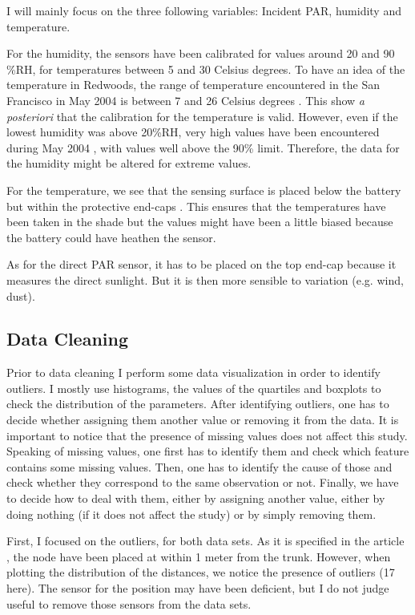 \documentclass[11pt]{article}\usepackage[]{graphicx}\usepackage[]{color}
\begin{document}
I will mainly focus on the three following variables: Incident PAR, humidity and temperature.

For the humidity, the sensors have been calibrated for values around 20 and 90 \%RH, for temperatures between 5 and 30 Celsius degrees. To have an idea of the temperature in Redwoods, the range of temperature encountered in the San Francisco in May 2004 is between 7 and 26 Celsius degrees \cite{weatherspark}. This show \textit{a posteriori} that the calibration for the temperature is valid. However, even if the lowest humidity was above 20\%RH, very high values have been encountered during May 2004 \cite{weatherspark}, with values well above the 90\% limit. Therefore, the data for the humidity might be altered for extreme values.

For the temperature, we see that the sensing surface is placed below the battery but within the protective end-caps \cite{tolle2005macroscope}. This ensures that the temperatures have been taken in the shade but the values might have been a little biased because the battery could have heathen the sensor.

As for the direct PAR sensor, it has to be placed on the top end-cap \cite{tolle2005macroscope} because it measures the direct sunlight. But it is then more sensible to variation (e.g. wind, dust). 

\subsection{Data Cleaning}

Prior to data cleaning I perform some data visualization in order to identify outliers. I mostly use histograms, the values of the quartiles and boxplots to check the distribution of the parameters. After identifying outliers, one has to decide whether assigning them another value or removing it from the data. It is important to notice that the presence of missing values does not affect this study. Speaking of missing values, one first has to identify them and check which feature contains some missing values. Then, one has to identify the cause of those and check whether they correspond to the same observation or not. Finally, we have to decide how to deal with them, either by assigning another value, either by doing nothing (if it does not affect the study) or by simply removing them.

First, I focused on the outliers, for both data sets. As it is specified in the article \cite{tolle2005macroscope}, the node have been placed at within 1 meter from the trunk. However, when plotting the distribution of the distances, we notice the presence of outliers (17 here). The sensor for the position may have been deficient, but I do not judge useful to remove those sensors from the data sets.
\end{document}
